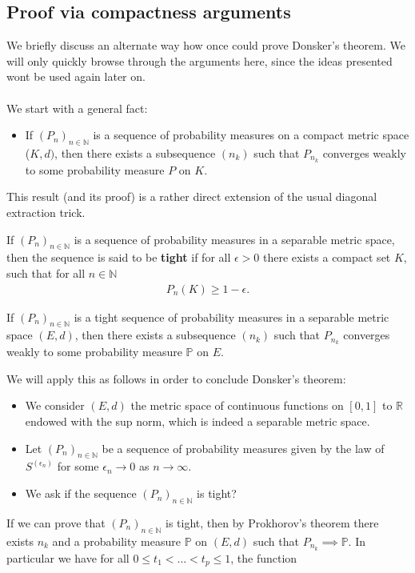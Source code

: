 \documentclass[../mainfile.tex]{subfiles}
\begin{document}
\subsection{Proof via compactness arguments}
We briefly discuss an alternate way how once could prove Donsker's theorem. We will only quickly browse through the arguments here, since the ideas presented wont be used again later on. 
\\\\
We start with a general fact:
\begin{itemize}
\item If $(P_n)_{n \in \mathbb{N}}$ is a sequence of probability measures on a compact metric space ($K,d)$, then there exists a subsequence $(n_k)$ such that $P_{n_k}$ converges weakly to some probability measure $P$ on $K$.
\end{itemize}
This result (and its proof) is a rather direct extension of the usual diagonal extraction trick. 
\begin{defn} If $(P_n)_{n \in \mathbb{N}}$ is a sequence of probability measures in a separable metric space, then the sequence is said to be \textbf{tight} if for all $\epsilon >0$ there exists a compact set $K$, such that for all $n \in \mathbb{N}$ 
\begin{align*}
P_n(K) \geq 1- \epsilon. 
\end{align*}
\end{defn}
\begin{thm} If $(P_n)_{n \in \mathbb{N}}$ is a tight sequence of probability measures in a separable metric space $(E,d)$, then there exists a subsequence $(n_k)$ such that $P_{n_k}$ converges weakly to some probability measure $\mathbb{P}$ on $E$. 
\end{thm}
We will apply this as follows in order to conclude Donsker's theorem:
\begin{itemize}
\item We consider $(E,d)$ the metric space of continuous functions on $[0,1]$ to $\mathbb{R}$ endowed with the sup norm, which is indeed a separable metric space. 
\item Let $(P_n)_{n \in \mathbb{N}}$ be a sequence of probability measures given by the law of $S^{( \epsilon_n)}$ for some $\epsilon_n \to 0$ as $n \to \infty$. 
\item We ask if the sequence $(P_n)_{n \in \mathbb{N}}$ is tight? 
\end{itemize} 
If we can prove that $(P_n)_{n \in \mathbb{N}}$ is tight, then by Prokhorov's theorem there exists $n_k$ and a probability measure $\mathbb{P}$ on $(E,d)$ such that $P_{n_k} \implies \mathbb{P}$. In particular we have for all $0\leq t_1< \dots < t_p \leq 1$, the function
\end{document}
